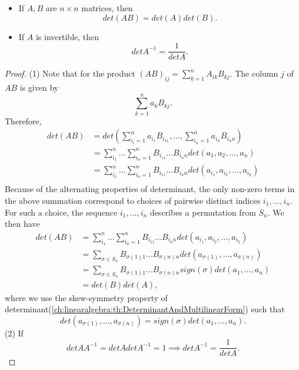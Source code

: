 \begin{refsection}
\begin{lemma}\hfill
\begin{itemize}
	\item If $A,B$ are $n\times n$ matrices, then
	$$det(AB) = det(A)det(B).$$	
	\item If $A$ is invertible, then
	$$det A^{-1} = \frac{1}{det A}.$$
\end{itemize}	
\end{lemma}
\begin{proof}
(1)	
Note that for the product $(AB)_{ij} = \sum_{k=1}^n A_{ik}B_{kj}.$
The column $j$ of $AB$ is given by
$$\sum_{k=1}^n a_kB_{kj}.$$
Therefore,
\begin{align*}
det(AB) &= det(\sum_{i_i=1}^n a_{i_1}B_{i_11},...,\sum_{i_n=1}^n a_{i_n}B_{i_nn}) \\
&=\sum_{i_1}^n...\sum_{i_n=1}^n B_{i_11}...B_{i_nn} det(a_1,a_2,...,a_n) \\
&=\sum_{i_1}^n...\sum_{i_n=1}^n B_{i_11}...B_{i_nn} det(a_{i_1},a_{i_2},...,a_{i_2}) \\
\end{align*}
Because of the alternating properties of determinant, the only non-zero terms in the above summation correspond to choices of pairwise distinct indices $i_1,...,i_n$. For such a choice, the sequence $i_1,...,i_n$ describes a permutation from $S_n$. We then have
\begin{align*}
det(AB) &= \sum_{i_1}^n...\sum_{i_n=1}^n B_{i_11}...B_{i_nn} det(a_{i_1},a_{i_2},...,a_{i_2}) \\
&=\sum_{\sigma\in S_n} B_{\sigma(1)1}...B_{\sigma(n)n} det(a_{\sigma(1)},...,a_{\sigma(n)}) \\
&=\sum_{\sigma\in S_n} B_{\sigma(1)1}...B_{\sigma(n)n} sign(\sigma)det(a_1,...,a_n) \\
&= det(B)det(A),
\end{align*}
where we use the skew-symmetry property of determinant(\autoref{ch:linearalgebra:th:DeterminantAndMultilinearForm}) such that
$$det(a_{\sigma(1)},...,a_{\sigma(n)}) =sign(\sigma)det(a_1,...,a_n). $$
(2) 
If 
$$det AA^{-1} = det A det A^{-1} = 1 \implies det A^{-1} = \frac{1}{det A}.$$
\end{proof}



\end{refsection}

